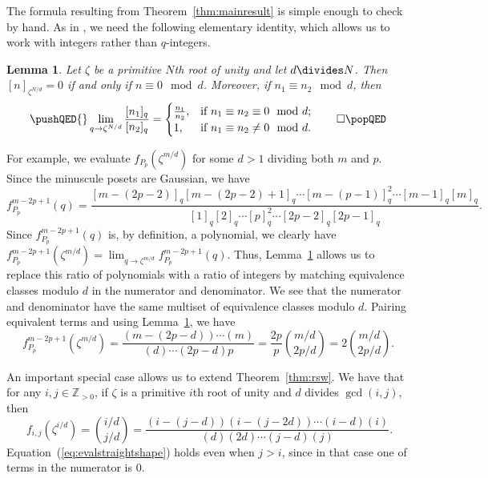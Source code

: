 \documentclass[12pt]{amsart}
\newtheorem{lemma}[theorem]{Lemma}
\theoremstyle{definition}
\theoremstyle{remark}
\numberwithin{equation}{section}
\begin{document}
The formula resulting from Theorem~\ref{thm:mainresult} is simple enough to check by hand. 
As in \cite[Proof of Theorem 7.1]{Reiner.Stanton.White}, we need the following elementary identity, which allows us to work with integers rather than $q$-integers. 


\begin{lemma}\label{lem:evalq}
Let $\zeta$ be a primitive $N$th root of unity and let $d \divides N$. Then $[n]_{\zeta^{N/d}} = 0$ if and only if $n \equiv 0 \mod d$. Moreover, if $n_1 \equiv n_2 \mod d$, then 
\begin{equation}\label{eq:evalq}
\pushQED{\qed}
\lim \limits_{q \rightarrow \zeta^{N/d}} \frac{[n_1]_q}{[n_2]_q} = 
\begin{cases}
\frac{n_1}{n_2}, &\text{if }  n_1 \equiv n_2 \equiv 0 \mod d; \\
1, &\text{if } n_1 \equiv n_2 \neq 0 \mod d.
\end{cases} \qedhere \popQED
\end{equation}
\end{lemma}

For example, we evaluate $f_{P_p}(\zeta^{m/d})$ for some $d > 1$ dividing both $m$ and $p$. Since the minuscule posets are Gaussian, we have
\tiny
\[   f_{P_p}^{m-2p+1}(q) = \frac{[m-(2p-2)]_{q}[m-(2p-2)+1]_{q} \cdots [m-(p-1)]_{q}^2 \cdots [m-1]_{q}[m]_{q}}{[1]_{q}[2]_{q} \cdots [p]_{q}^2 \cdots [2p-2]_{q}[2p-1]_{q}}. \]
\normalsize
Since $f^{m-2p+1}_{P_p}(q)$ is, by definition, a polynomial, we clearly have $f^{m-2p+1}_{P_p}(\zeta^{m/d}) = \lim_{q \rightarrow \zeta^{m/d}} f^{m-2p+1}_{P_p}(q)$.
Thus, Lemma~\ref{lem:evalq} allows us to replace this ratio of polynomials with a ratio of integers by matching equivalence classes modulo $d$ in the numerator and denominator. We see that the numerator and denominator have the same multiset of equivalence classes modulo $d$. Pairing equivalent terms and using Lemma~\ref{lem:evalq}, we have
\[ f_{P_p}^{m-2p+1}(\zeta^{m/d}) = \frac{(m-(2p-d)) \cdots  (m)}{(d) \cdots  (2p-d) p} = \frac{2p}{p}  \binom{m/d}{2p/d} = 2 \binom{m/d}{2p/d}.\]     

An important special case allows us to extend Theorem~\ref{thm:rsw}. We have that for any $i, j \in \mathbb{Z}_{> 0}$, if $\zeta$ is a primitive $i$th root of unity and $d$ divides $\gcd(i,j)$, then
\begin{equation}~\label{eq:evalstraightshape}
f_{i,j}(\zeta^{i/d}) = \binom{i/d}{j/d} = \frac{(i-(j-d))(i-(j-2d)) \cdots  (i-d)(i)}{(d)  (2d)  \cdots  (j-d) (j)}. 
\end{equation}
Equation~(\ref{eq:evalstraightshape}) holds even when $j > i$, since in that case one of terms in the numerator is $0$. 
\end{document}
